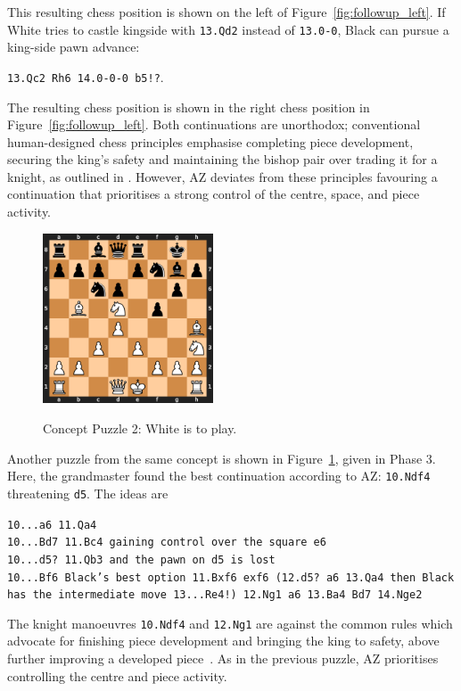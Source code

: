 \documentclass{article}
\newcommand{\ct}[1]{\texttt{#1}}
\begin{document}
This resulting chess position is shown on the left of Figure~\ref{fig:followup_left}. If White tries to castle kingside with \ct{13.Qd2} instead of \ct{13.0-0}, Black can pursue a king-side pawn advance:
\begin{displayquote}
\ct{13.Qc2 Rh6 14.0-0-0 b5!?}.
\end{displayquote}
The resulting chess position is shown in the right chess position in Figure~\ref{fig:followup_left}.
Both continuations are unorthodox; conventional human-designed chess principles emphasise completing piece development, securing the king's safety and maintaining the bishop pair over trading it for a knight, as outlined in \cite{10goldenrules}. However, AZ deviates from these principles favouring a continuation that prioritises a strong control of the centre, space, and piece activity. 

\begin{figure}[!ht]
\caption{Concept Puzzle 2: White is to play.}
\centering
\includegraphics[width=0.45\textwidth]{chess_positions/nf4.png}
\label{fig:teaching_succ_1_phase3}
\end{figure}

Another puzzle from the same concept is shown in Figure~\ref{fig:teaching_succ_1_phase3}, given in Phase 3.
Here, the grandmaster found the best continuation according to AZ: \ct{10.Ndf4} threatening \ct{d5}. The ideas are
\begin{displayquote}
\ct{10...a6 11.Qa4 \\ 
10...Bd7 11.Bc4 gaining control over the square e6 \\
10...d5?~11.Qb3 and the pawn on d5 is lost \\ 
10...Bf6 Black's best option 11.Bxf6 exf6 (12.d5?~a6 13.Qa4 then Black has the intermediate move 13...Re4!)~12.Ng1 a6 13.Ba4 Bd7 14.Nge2}
\end{displayquote}
The knight manoeuvres \ct{10.Ndf4} and \ct{12.Ng1} are against the common rules which advocate for finishing piece development and bringing the king to safety, above further improving a developed piece~\citep{10goldenrules, step_method, openings_carsten}. As in the previous puzzle, AZ prioritises controlling the centre and piece activity.
\end{document}
